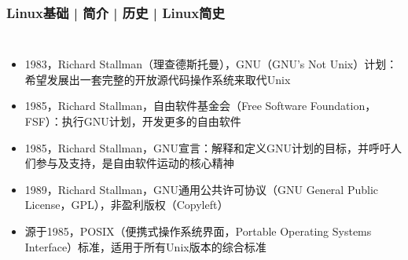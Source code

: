 \begin{frame}
  \frametitle{Linux基础 | 简介 | 历史 | Linux简史}
  \begin{columns}
  \begin{itemize}[<+->]
    \item 1983，\alert{Richard Stallman}（理查德\textbullet 斯托曼），\alert{GNU（GNU's Not Unix）}计划：希望发展出一套完整的开放源代码操作系统来取代Unix
    \item 1985，Richard Stallman，自由软件基金会（Free Software Foundation，FSF）：执行GNU计划，开发更多的自由软件
    \item 1985，Richard Stallman，GNU宣言：解释和定义GNU计划的目标，并呼吁人们参与及支持，是自由软件运动的核心精神
    \item 1989，Richard Stallman，GNU通用公共许可协议（GNU General Public License，\alert{GPL}），非盈利版权（Copyleft）
    \item 源于1985，POSIX（便携式操作系统界面，Portable Operating Systems Interface）标准，适用于所有Unix版本的综合标准
  \end{itemize}
  \end{columns}
\end{frame}

